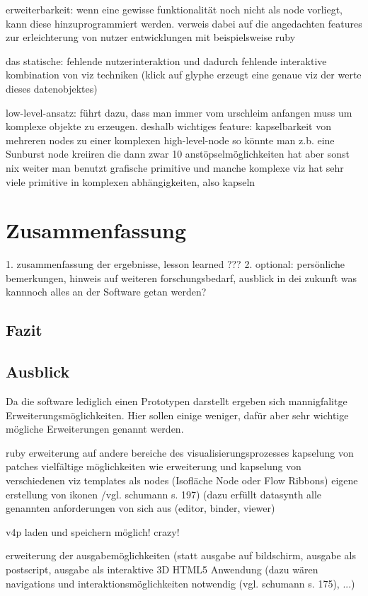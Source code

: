 \documentclass[a4paper, 12pt, onepage, pdftex, headsepline, footsepline]{scrreprt}
\begin{document}
erweiterbarkeit:
wenn eine gewisse funktionalität noch nicht als node vorliegt, kann diese hinzuprogrammiert werden. verweis dabei auf die angedachten features zur erleichterung von nutzer entwicklungen mit beispielsweise ruby

das statische:
fehlende nutzerinteraktion und dadurch fehlende interaktive kombination von viz techniken (klick auf glyphe erzeugt eine genaue viz der werte dieses datenobjektes)

low-level-ansatz:
führt dazu, dass man immer vom urschleim anfangen muss um komplexe objekte zu erzeugen. deshalb wichtiges feature: kapselbarkeit von mehreren nodes zu einer komplexen high-level-node
so könnte man z.b. eine Sunburst node kreiiren die dann zwar 10 anstöpselmöglichkeiten hat aber sonst nix weiter
man benutzt grafische primitive und manche komplexe viz hat sehr viele primitive in komplexen abhängigkeiten, also kapseln

\chapter{Zusammenfassung}
1. zusammenfassung der ergebnisse, lesson learned
???
2. optional: persönliche bemerkungen, hinweis auf weiteren forschungsbedarf, ausblick in dei zukunft
was kannnoch alles an der Software getan werden?
\section{Fazit}
\section{Ausblick}
Da die software lediglich einen Prototypen darstellt ergeben sich mannigfalitge Erweiterungsmöglichkeiten. Hier sollen einige weniger, dafür aber sehr wichtige mögliche Erweiterungen genannt werden.

ruby
erweiterung auf andere bereiche des visualisierungsprozesses
kapselung von patches
  vielfältige möglichkeiten wie
    erweiterung und kapselung von verschiedenen viz templates als nodes (Isofläche Node oder Flow Ribbons)
    eigene erstellung von ikonen /vgl. schumann s. 197)
    (dazu erfüllt datasynth alle genannten anforderungen von sich aus (editor, binder, viewer)

v4p laden und speichern möglich! crazy!

erweiterung der ausgabemöglichkeiten (statt ausgabe auf bildschirm, ausgabe als postscript, ausgabe als interaktive 3D HTML5 Anwendung (dazu wären navigations und interaktionsmöglichkeiten notwendig (vgl. schumann s. 175), ...)
\end{document}
